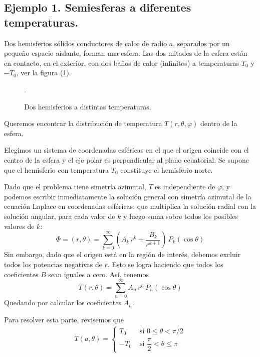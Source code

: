 \subsection{Ejemplo 1. Semiesferas a diferentes temperaturas.}\label{sec:sub_seccion_01}
Dos hemisferios sólidos conductores de calor de radio $a$, separados por un pequeño espacio aislante, forman una esfera. Las dos mitades de la esfera están en contacto, en el exterior, con dos baños de calor (infinitos) a temperaturas $T_{0}$ y $-T_{0} $, ver la figura (\ref{fig:figura_esfera_01}).
\begin{figure}[H]
    \centering
    .
    \caption{Dos hemisferios a distintas temperaturas.}
    \label{fig:figura_esfera_01}
\end{figure}
Queremos encontrar la distribución de temperatura $T(r, \theta, \varphi)$ dentro de la esfera.
\par
Elegimos un sistema de coordenadas esféricas en el que el origen coincide con el centro de la esfera y el eje polar es perpendicular al plano ecuatorial. Se supone que el hemisferio con temperatura $T_{0}$ constituye el hemisferio norte.
\par
Dado que el problema tiene simetría azimutal, $T$ es independiente de $\varphi$, y podemos escribir inmediatamente la solución general con simetría azimutal de la ecuación Laplace en coordenadas esféricas: que multiplica la solución radial con la solución angular, para cada valor de $k$ y luego suma sobre todos los posibles valores de $k$:
\begin{equation}
\Phi = (r, \theta) = \sum_{k=0}^{\infty} \left( A_{k} \, r^{k} + \dfrac{B_{k}}{r^{k+1}} \right) \, P_{k} (\cos \theta)
\label{eq:ecuacion_26_29}
\end{equation}
Sin embargo, dado que el origen está en la región de interés, debemos excluir todos los potencias negativas de $r$. Esto se logra haciendo que todos los coeficientes $B$ sean iguales a cero. Así, tenemos
\begin{equation}
T(r, \theta) = \sum_{n=0}^{\infty} A_{n} \, r^{n} \, P_{n} (\cos \theta)
\label{eq:ecuacion_26_50}
\end{equation}
Quedando por calcular los coeficientes $A_{n}$.
\par
Para resolver esta parte, revisemos que
\begin{align*}
T (a, \theta) = \begin{cases}
T_{0} & \mbox{ si } 0 \leq \theta < \pi / 2 \\
-T_{0} & \mbox{ si } \dfrac{\pi}{2} < \theta \leq \pi
\end{cases}
\end{align*}
